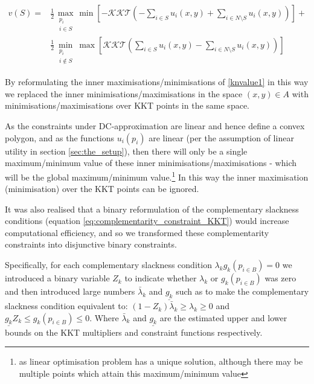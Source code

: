 \begin{equation}
\label{kkt_optimization1}
\begin{aligned}
v(S) =& 
 \frac{1}{2}\max_{\substack{p_i \\ i\in S}}   \min\left[-\mathcal{KKT}\left(-\sum_{i\in S} u_i(x,y) + \sum_{i\in N\setminus S}u_i(x,y)\right)\right] +\\
&\frac{1}{2}\min_{\substack{p_i \\ i\notin S}}\max\left[\mathcal{KKT}\left(\sum_{i\in S} u_i(x,y) - \sum_{i\in N\setminus S}u_i(x,y)\right)\right]
\end{aligned}
\end{equation}


By reformulating the inner maximisations/minimisations of \eqref{knvalue1} in this way we replaced the inner minimisations/maximisations in the space $(x,y)\in A$ with minimisations/maximisations over KKT points in the same space.%

As the constraints under DC-approximation are linear and hence define a convex polygon,
and as the functions $u_i(p_i)$ are linear (per the assumption of linear utility in section \ref{sec:the_setup}), then there will only be a single maximum/minimum value of these inner minimisations/maximisations - which will be the global maximum/minimum value.\footnote{as linear optimisation problem has a unique solution, although there may be multiple points which attain this maximum/minimum value}
In this way the inner maximisation (minimisation) over the KKT points can be ignored.

It was also realised that a binary reformulation of the complementary slackness conditions (equation \ref{eq:complementarity_constraint_KKT}) would increase computational efficiency, and so we transformed these complementarity constraints into disjunctive binary constraints.

Specifically, for each complementary slackness condition $\lambda_kg_k(p_{i\in B}) = 0$ we introduced a binary variable $Z_k$ to indicate whether $\lambda_k$ or $g_k(p_{i\in B})$ was zero and then introduced large numbers $\bar{\lambda}_k$ and $ \underline{g_k} $ such as to make the complementary slackness condition equivalent to: $(1-Z_k)\bar{\lambda}_k \ge \lambda_k \ge 0$ and $\underline{g_k}Z_k\le g_k(p_{i\in B})\le 0$.
Where $\bar{\lambda}_k$ and $\underline{g_k}$ are the estimated upper and lower bounds on the KKT multipliers and constraint functions respectively.

